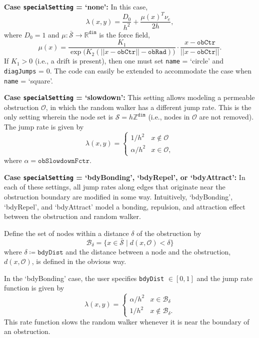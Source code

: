 \documentclass[11pt, oneside]{article}   	%
\theoremstyle{definition}
\newcommand{\real}{{\mathbb R}}
\newcommand\sS{\mathcal{S}}
\newcommand{\integ}{{\mathbb Z}}
\newcommand\oS{\bar{\sS}}
\begin{document}
{\bf Case \texttt{specialSetting} = `none':}
In this case,
\begin{equation}\label{eqn:rate-normal}
	\lambda(x,y) = \frac{D_0}{h^2} + \frac{\mu(x)^T \nu_e}{2h},
\end{equation}
where $D_0 = 1$ and $\mu: \oS \rightarrow \real^{\texttt{dim}}$ is the force field,
\begin{equation}\label{eqn:drift}
\mu(x) = \frac{K_1}{\exp\big(K_2(||x - \texttt{obCtr}|| - \texttt{obRad})\big)} \cdot \frac{x - \texttt{obCtr}}{||x - \texttt{obCtr}||}.
\end{equation}
If $K_1 > 0$ (i.e., a drift is present), then one must set \texttt{name} = `circle' and \texttt{diagJumps} = 0. The code can easily be extended to accommodate the case when \texttt{name} = `square'.

{\bf Case \texttt{specialSetting} = `slowdown':}
This setting allows modeling a permeable obstruction $\mathcal{O}$, in which the random walker has a different jump rate. This is the only setting wherein the node set is $\sS = h \integ^{\texttt{dim}}$ (i.e., nodes in $\mathcal{O}$ are not removed). The jump rate is given by
\begin{equation}\label{eqn:rate-slowdown}
\lambda(x,y) = 
	\begin{cases}
		1/h^2 & x \notin \mathcal{O} \\
		\alpha/h^2 & x \in \mathcal{O},
	\end{cases}
\end{equation}
where $\alpha = \texttt{obSlowdownFctr}$.

{\bf Case \texttt{specialSetting} = `bdyBonding', `bdyRepel', or `bdyAttract':} In each of these settings, all jump rates along edges that originate near the obstruction boundary are modified in some way. Intuitively, `bdyBonding', `bdyRepel', and `bdyAttract' model a bonding, repulsion, and attraction effect between the obstruction and random walker.

Define the set of nodes within a distance $\delta$ of the obstruction by
\begin{equation}\label{eqn:bdy-nodes}
\mathcal{B}_{\delta} = \{x \in \oS \;|\; d(x,\mathcal{O}) < \delta\}
\end{equation}
where $\delta \coloneqq \texttt{bdyDist}$ and the distance between a node and the obstruction, $d(x,\mathcal{O})$, is defined in the obvious way.

In the `bdyBonding' case, the user specifies \texttt{bdyDist} $\in [0,1]$ and the jump rate function is given by
\begin{equation}\label{eqn:rate-bdyBonding}
	\lambda(x,y) =
	\begin{cases}
		 \alpha/h^2 & x \in \mathcal{B}_{\delta} \\
		 1/h^2 & x \notin \mathcal{B}_{\delta}.
	\end{cases}
\end{equation}
This rate function slows the random walker whenever it is near the boundary of an obstruction.
\end{document}
